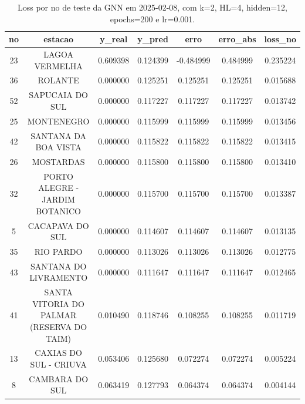 \begin{table}[h]
\centering
\caption{Loss por no de teste da GNN em 2025-02-08, com k=2, HL=4, hidden=12, epochs=200 e lr=0.001.}
\label{tab:gnn_loss_k2_hl4_h12_e200_d20250208}
\begin{tabular}{ccccccc}
\toprule
no & estacao & y\_real & y\_pred & erro & erro\_abs & loss\_no \\
\midrule
23 & LAGOA VERMELHA & 0.609398 & 0.124399 & -0.484999 & 0.484999 & 0.235224 \\
36 & ROLANTE & 0.000000 & 0.125251 & 0.125251 & 0.125251 & 0.015688 \\
52 & SAPUCAIA DO SUL & 0.000000 & 0.117227 & 0.117227 & 0.117227 & 0.013742 \\
25 & MONTENEGRO & 0.000000 & 0.115999 & 0.115999 & 0.115999 & 0.013456 \\
42 & SANTANA DA BOA VISTA & 0.000000 & 0.115822 & 0.115822 & 0.115822 & 0.013415 \\
26 & MOSTARDAS & 0.000000 & 0.115800 & 0.115800 & 0.115800 & 0.013410 \\
32 & PORTO ALEGRE - JARDIM BOTANICO & 0.000000 & 0.115700 & 0.115700 & 0.115700 & 0.013387 \\
5 & CACAPAVA DO SUL & 0.000000 & 0.114607 & 0.114607 & 0.114607 & 0.013135 \\
35 & RIO PARDO & 0.000000 & 0.113026 & 0.113026 & 0.113026 & 0.012775 \\
43 & SANTANA DO LIVRAMENTO & 0.000000 & 0.111647 & 0.111647 & 0.111647 & 0.012465 \\
41 & SANTA VITORIA DO PALMAR (RESERVA DO TAIM) & 0.010490 & 0.118746 & 0.108255 & 0.108255 & 0.011719 \\
13 & CAXIAS DO SUL - CRIUVA & 0.053406 & 0.125680 & 0.072274 & 0.072274 & 0.005224 \\
8 & CAMBARA DO SUL & 0.063419 & 0.127793 & 0.064374 & 0.064374 & 0.004144 \\
\bottomrule
\end{tabular}
\end{table}

